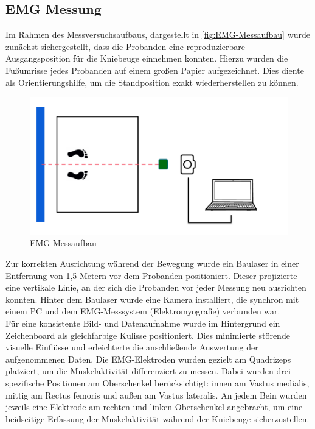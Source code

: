 \subsection{EMG Messung}
Im Rahmen des Messversuchsaufbaus, dargestellt in \autoref{fig:EMG-Messaufbau} wurde zunächst sichergestellt, dass die Probanden eine reproduzierbare Ausgangsposition für die Kniebeuge einnehmen konnten.
Hierzu wurden die Fußumrisse jedes Probanden auf einem großen Papier aufgezeichnet.
Dies diente als Orientierungshilfe, um die Standposition exakt wiederherstellen zu können.
\begin{figure}[h!]
    \centering
    \includegraphics[width=0.8\linewidth]{img/Aufbau-EMG.png}
    \caption{EMG Messaufbau}
    \label{fig:EMG-Messaufbau}
\end{figure}
Zur korrekten Ausrichtung während der Bewegung wurde ein Baulaser in einer Entfernung von 1,5 Metern vor dem Probanden positioniert.
Dieser projizierte eine vertikale Linie, an der sich die Probanden vor jeder Messung neu ausrichten konnten.
Hinter dem Baulaser wurde eine Kamera installiert, die synchron mit einem PC und dem EMG-Messsystem (Elektromyografie) verbunden war.
\\
Für eine konsistente Bild- und Datenaufnahme wurde im Hintergrund ein Zeichenboard als gleichfarbige Kulisse positioniert. Dies minimierte störende visuelle Einflüsse und erleichterte die anschließende Auswertung der aufgenommenen Daten.
Die EMG-Elektroden wurden gezielt am Quadrizeps platziert, um die Muskelaktivität differenziert zu messen.
Dabei wurden drei spezifische Positionen am Oberschenkel berücksichtigt: innen am Vastus medialis, mittig am Rectus femoris und außen am Vastus lateralis.
An jedem Bein wurden jeweils eine Elektrode am rechten und linken Oberschenkel angebracht, um eine beidseitige Erfassung der Muskelaktivität während der Kniebeuge sicherzustellen.
